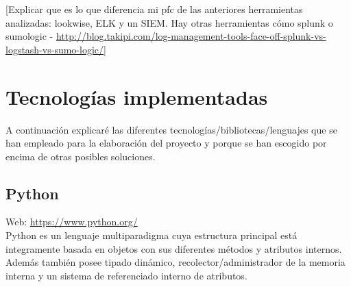 [Explicar que es lo que diferencia mi pfc de las anteriores herramientas analizadas: lookwise, ELK y un SIEM. Hay otras herramientas cómo splunk o sumologic - \url{http://blog.takipi.com/log-management-tools-face-off-splunk-vs-logstash-vs-sumo-logic/}]

\section{Tecnologías implementadas}

A continuación explicaré las diferentes tecnologías/bibliotecas/lenguajes que se han empleado para la elaboración del proyecto y porque se han escogido por encima de otras posibles soluciones.

\subsection{Python}


Web: \url{https://www.python.org/}\\

Python es un lenguaje multiparadigma cuya estructura principal está integramente basada en objetos con sus diferentes métodos y atributos internos. Además también posee tipado dinámico, recolector/administrador de la memoria interna y un sistema de referenciado interno de atributos. \\

